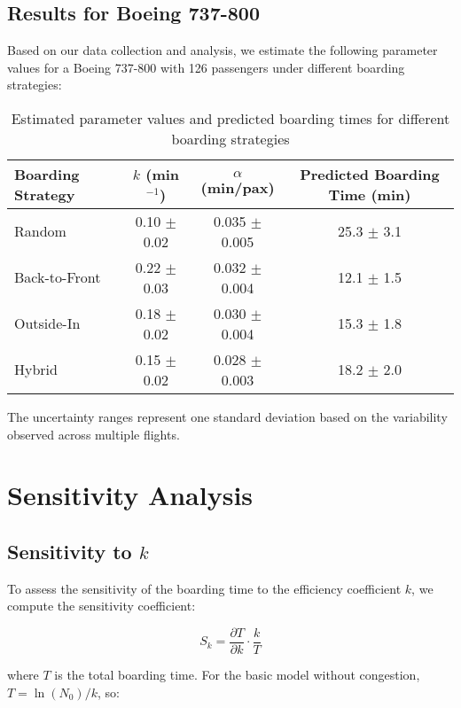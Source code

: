 \documentclass[12pt,a4paper]{article}
\begin{document}
\subsection{Results for Boeing 737-800}

Based on our data collection and analysis, we estimate the following parameter values for a Boeing 737-800 with 126 passengers under different boarding strategies:

\begin{table}[H]
\centering
\begin{tabular}{|l|c|c|c|}
\hline
\textbf{Boarding Strategy} & \textbf{$k$ (min$^{-1}$)} & \textbf{$\alpha$ (min/pax)} & \textbf{Predicted Boarding Time (min)} \\ \hline
Random & 0.10 $\pm$ 0.02 & 0.035 $\pm$ 0.005 & 25.3 $\pm$ 3.1 \\ \hline
Back-to-Front & 0.22 $\pm$ 0.03 & 0.032 $\pm$ 0.004 & 12.1 $\pm$ 1.5 \\ \hline
Outside-In & 0.18 $\pm$ 0.02 & 0.030 $\pm$ 0.004 & 15.3 $\pm$ 1.8 \\ \hline
Hybrid & 0.15 $\pm$ 0.02 & 0.028 $\pm$ 0.003 & 18.2 $\pm$ 2.0 \\ \hline
\end{tabular}
\caption{Estimated parameter values and predicted boarding times for different boarding strategies}
\label{tab:parameter_estimates}
\end{table}

The uncertainty ranges represent one standard deviation based on the variability observed across multiple flights.

\section{Sensitivity Analysis}

\subsection{Sensitivity to $k$}

To assess the sensitivity of the boarding time to the efficiency coefficient $k$, we compute the sensitivity coefficient:

\begin{equation}
S_k = \frac{\partial T}{\partial k} \cdot \frac{k}{T}
\end{equation}

where $T$ is the total boarding time. For the basic model without congestion, $T = \ln(N_0) / k$, so:
\end{document}
